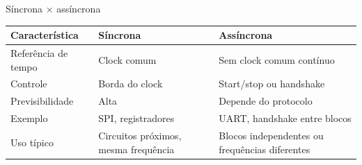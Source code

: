 \begin{frame}{Síncrona \texorpdfstring{$\times$}{x} assíncrona}
  \small
  \begin{tabularx}{\linewidth}{@{}>{\raggedright\arraybackslash}X|>{\raggedright\arraybackslash}X|>{\raggedright\arraybackslash}X@{}}
    \textbf{Característica} & \textbf{Síncrona} & \textbf{Assíncrona} \\ \hline
    Referência de tempo & Clock comum & Sem clock comum contínuo \\ \hline
    Controle & Borda do clock & Start/stop ou handshake \\ \hline
    Previsibilidade & Alta & Depende do protocolo \\ \hline
    Exemplo & SPI, registradores & UART, handshake entre blocos \\ \hline
    Uso típico & Circuitos próximos, mesma frequência & Blocos independentes ou frequências diferentes
  \end{tabularx}
\end{frame}